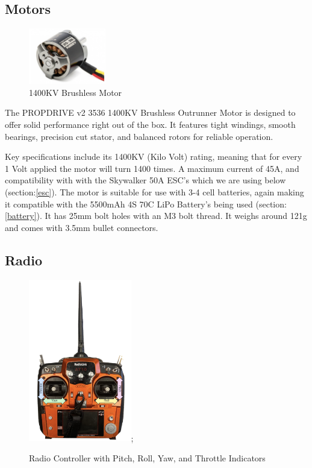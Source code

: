 \documentclass{article}
\begin{document}
\subsection{Motors}\label{motors}
\begin{figure}[H]
  \centering
  \includegraphics[width=0.3\textwidth]{Pictures/motors.png} 
  \caption{1400KV Brushless Motor}
  \label{fig:motor}
\end{figure}
The PROPDRIVE v2 3536 1400KV Brushless Outrunner Motor is designed to offer solid performance right out of the box. It features tight windings, smooth bearings, precision cut stator, and balanced rotors for reliable operation.

Key specifications include its 1400KV (Kilo Volt) rating, meaning that for every 1 Volt applied the motor will turn 1400 times. A maximum current of 45A, and compatibility with with the Skywalker 50A ESC's which we are using below (section:\ref{esc}).
The motor is suitable for use with 3-4 cell batteries, again making it compatible with the 5500mAh 4S 70C LiPo Battery's being used (section:\ref{battery}). It has 25mm bolt holes with an M3 bolt thread. It weighs around 121g and comes with 3.5mm bullet connectors.

\subsection{Radio}\label{radio}
\begin{figure}[H]
  \centering
  \includegraphics[width=0.4\textwidth]{Pictures/radio.jpg};
  \caption{Radio Controller with Pitch, Roll, Yaw, and Throttle Indicators}
  \label{fig:radio_controller}
\end{figure}
\end{document}
